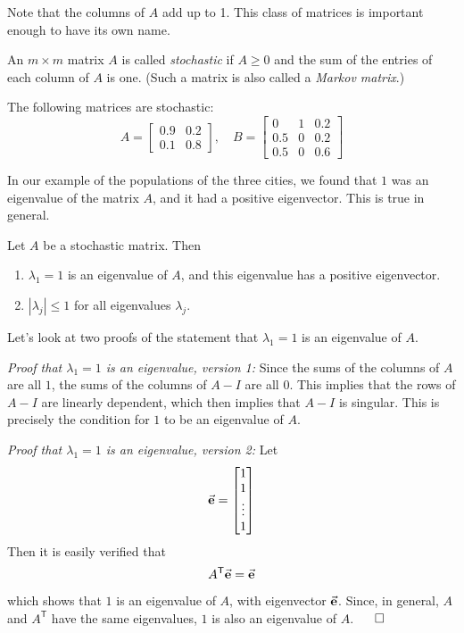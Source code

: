 Note that the columns of $A$ add up to 1.  This class of matrices
is important enough to have its own name.
\begin{definition}
An $m\times m$ matrix $A$ is called \emph{stochastic}
if $A \ge 0$ and the sum of the entries
of each column of $A$ is one.
(Such a matrix is also called a \emph{Markov matrix}.)
\end{definition}
\begin{xexample}
The following matrices are stochastic:
\begin{equation}
  A = \begin{bmatrix}
          0.9 & 0.2 \\ 0.1 & 0.8
      \end{bmatrix},
  \quad
  B = \begin{bmatrix}
          0 & 1 & 0.2 \\ 0.5 & 0 & 0.2 \\ 0.5 & 0 & 0.6
      \end{bmatrix}
\label{eqn:stoch:examples}
\end{equation}
\end{xexample}
In our example of the populations of the three cities,
we found that $1$ was an eigenvalue of the matrix $A$, and it
had a positive eigenvector.  This is true in general.
\begin{theorem}
Let $A$ be a stochastic matrix. Then
\begin{enumerate}
\item $\lambda_1 = 1$ is an eigenvalue of $A$,
and this eigenvalue has a positive eigenvector.
\item $|\lambda_j| \le 1$ for all eigenvalues $\lambda_j$.
\end{enumerate}
\end{theorem}
%
Let's look at two proofs of the statement that
$\lambda_1=1$ is an eigenvalue of $A$.

\emph{Proof that $\lambda_1=1$ is an eigenvalue, version 1:}
Since the sums of the columns of $A$ are all $1$,
the sums of the columns of $A-I$ are all $0$.
This implies that the rows of $A-I$ are linearly
dependent, which then implies that
$A-I$ is singular.  This is precisely the condition
for $1$ to be an eigenvalue of $A$.

\emph{Proof that $\lambda_1=1$ is an eigenvalue, version 2:}
Let
\begin{equation}
   \vec{\textbf{e}} = \begin{bmatrix} 1 \\ 1 \\ \vdots \\ 1\end{bmatrix}
\end{equation}
Then it is easily verified that
\begin{equation}
  A^{\textsf{T}}\vec{\textbf{e}} = \vec{\textbf{e}}
\end{equation}
which shows that $1$ is an eigenvalue of $A$, with
eigenvector $\vec{\textbf{e}}$.
Since, in general, $A$ and $A^{\textsf{T}}$ have the
same eigenvalues, $1$ is also an eigenvalue of $A$.
\hfill $\qed$

